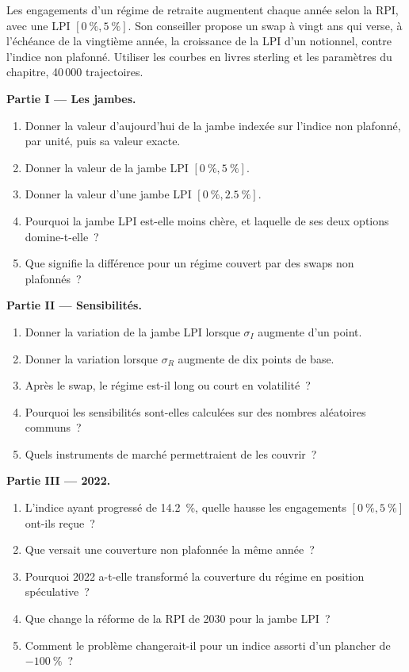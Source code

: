 \begin{problem}\label{pb:rc:inflation-derivatives:1}
Les engagements d'un régime de retraite augmentent chaque année selon la RPI, avec une LPI $[0~\%,5~\%]$. Son conseiller
propose un swap à vingt ans qui verse, à l'échéance de la vingtième année, la croissance de la LPI d'un notionnel, contre
l'indice non plafonné. Utiliser les courbes en livres sterling et les paramètres du chapitre, 40\,000 trajectoires.

\medskip\noindent\textbf{Partie I --- Les jambes.}
\begin{enumerate}
\item Donner la valeur d'aujourd'hui de la jambe indexée sur l'indice non plafonné, par unité, puis sa valeur exacte.
\item Donner la valeur de la jambe LPI $[0~\%,5~\%]$.
\item Donner la valeur d'une jambe LPI $[0~\%,2.5~\%]$.
\item Pourquoi la jambe LPI est-elle moins chère, et laquelle de ses deux options domine-t-elle~?
\item Que signifie la différence pour un régime couvert par des swaps non plafonnés~?
\end{enumerate}

\medskip\noindent\textbf{Partie II --- Sensibilités.}
\begin{enumerate}[resume]
\item Donner la variation de la jambe LPI lorsque $\sigma_I$ augmente d'un point.
\item Donner la variation lorsque $\sigma_R$ augmente de dix points de base.
\item Après le swap, le régime est-il long ou court en volatilité~?
\item Pourquoi les sensibilités sont-elles calculées sur des nombres aléatoires communs~?
\item Quels instruments de marché permettraient de les couvrir~?
\end{enumerate}

\medskip\noindent\textbf{Partie III --- 2022.}
\begin{enumerate}[resume]
\item L'indice ayant progressé de 14.2~\%, quelle hausse les engagements $[0~\%,5~\%]$ ont-ils reçue~?
\item Que versait une couverture non plafonnée la même année~?
\item Pourquoi 2022 a-t-elle transformé la couverture du régime en position spéculative~?
\item Que change la réforme de la RPI de 2030 pour la jambe LPI~?
\item Comment le problème changerait-il pour un indice assorti d'un plancher de $-100~\%$~?
\end{enumerate}


\end{problem}
